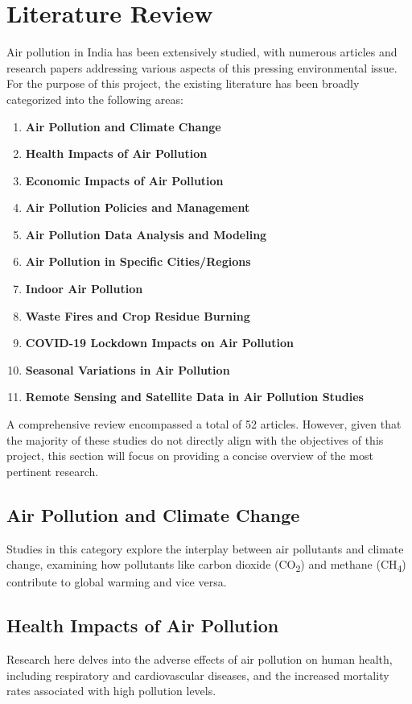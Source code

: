 \documentclass[12pt]{article}
\begin{document}
\section{Literature Review}

Air pollution in India has been extensively studied, with numerous articles and research papers addressing various aspects of this pressing environmental issue. For the purpose of this project, the existing literature has been broadly categorized into the following areas:

\begin{enumerate}
    \item \textbf{Air Pollution and Climate Change}
    \item \textbf{Health Impacts of Air Pollution}
    \item \textbf{Economic Impacts of Air Pollution}
    \item \textbf{Air Pollution Policies and Management}
    \item \textbf{Air Pollution Data Analysis and Modeling}
    \item \textbf{Air Pollution in Specific Cities/Regions}
    \item \textbf{Indoor Air Pollution}
    \item \textbf{Waste Fires and Crop Residue Burning}
    \item \textbf{COVID-19 Lockdown Impacts on Air Pollution}
    \item \textbf{Seasonal Variations in Air Pollution}
    \item \textbf{Remote Sensing and Satellite Data in Air Pollution Studies}
\end{enumerate}

A comprehensive review encompassed a total of 52 articles. However, given that the majority of these studies do not directly align with the objectives of this project, this section will focus on providing a concise overview of the most pertinent research.

\subsection{Air Pollution and Climate Change}
Studies in this category explore the interplay between air pollutants and climate change, examining how pollutants like carbon dioxide (CO\textsubscript{2}) and methane (CH\textsubscript{4}) contribute to global warming and vice versa.

\subsection{Health Impacts of Air Pollution}
Research here delves into the adverse effects of air pollution on human health, including respiratory and cardiovascular diseases, and the increased mortality rates associated with high pollution levels.
\end{document}
